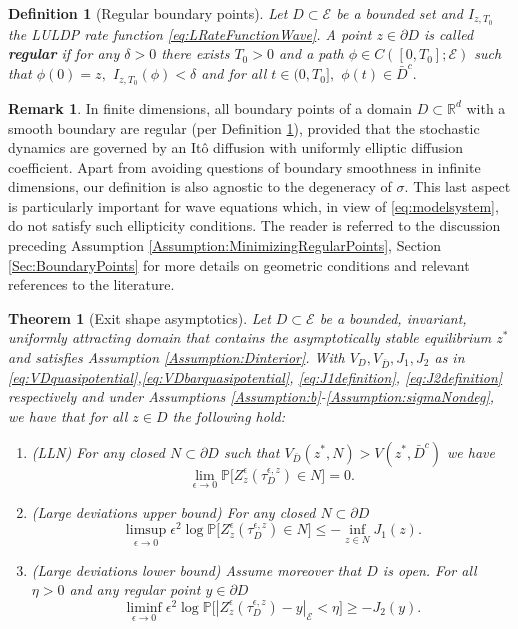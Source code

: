 \documentclass[10pt, reqno]{amsart}
\newcommand{\R}{\mathbb{R}}
\newcommand{\pr}{\mathbb{P}}
\newcommand{\e}{\mathcal{E}}
\newtheorem{thm}{Theorem}
\newtheorem{dfn}{Definition}
\theoremstyle{definition}
\newtheorem{rem}{Remark}
\numberwithin{lem}{section}
\numberwithin{cor}{section}
\numberwithin{prop}{section}
\numberwithin{thm}{section}
\numberwithin{dfn}{section}
\begin{document}
 \begin{dfn}[Regular boundary points]\label{def:regularpoints}
   Let $D\subset\e$ be a bounded set and $I_{z,T_0}$ the LULDP rate function \eqref{eq:LRateFunctionWave}. A point $z\in\partial D$ is called \textbf{regular} if for any $\delta>0$ there exists $T_0>0$ and a path $\phi\in C([0,T_0];\e)$ such that $\phi(0)=z,$ $I_{z,T_0}(\phi)<\delta$
   and for all $t\in(0, T_0],$ $\phi(t)\in\bar{D}^c.$
\end{dfn}


\begin{rem}\label{Rem:RegularPoints} In finite dimensions, all boundary points of a domain $D\subset\R^d$ with a smooth boundary are regular (per Definition \ref{def:regularpoints}), provided that the stochastic dynamics are governed by an It\^o diffusion with uniformly elliptic diffusion coefficient. Apart from avoiding questions of boundary smoothness in infinite dimensions, our definition is also agnostic to the degeneracy of $\sigma.$ This last aspect is particularly important for wave equations which, in view of \eqref{eq:modelsystem}, do not satisfy such ellipticity conditions. The reader is referred to the discussion preceding Assumption \ref{Assumption:MinimizingRegularPoints}, Section \ref{Sec:BoundaryPoints} for more details on geometric conditions and relevant references to the literature. 
\end{rem}

\begin{thm}[Exit shape asymptotics]\label{thm:exitshapeldp} Let $D\subset\e$ be a bounded, invariant, uniformly attracting domain that contains  the asymptotically stable equilibrium $z^*$ and satisfies Assumption \ref{Assumption:Dinterior}. With $V_D, V_{\bar{D}}, J_1, J_2$ as in \eqref{eq:VDquasipotential},\eqref{eq:VDbarquasipotential}, \eqref{eq:J1definition}, \eqref{eq:J2definition} respectively and under Assumptions \ref{Assumption:b}-\ref{Assumption:sigmaNondeg}, we have that for all $z\in D$ the following hold:
\begin{enumerate}
\item (\textnormal{LLN}) For any closed $N\subset\partial D$ such that $V_{\bar{D}}(z^*,N)>V(z^*,  \bar{D}^c)$ we have $$\lim_{\epsilon\to 0}\pr\bigg[  Z^\epsilon_z(\tau_D^{\epsilon, z})\in N\bigg]=0.$$
    \item(\textnormal{Large deviations upper bound}) For any closed  $N\subset \partial D$   \begin{equation}\label{eq:exitshapeLDPub}
    \limsup_{\epsilon\to 0}\epsilon^2\log\pr\bigg[Z^\epsilon_z(\tau^{\epsilon, z}_{D})\in N\bigg]\leq -\inf_{z\in N}J_1(z).    
    \end{equation}
    \item (\textnormal{Large deviations lower bound}) Assume moreover that $D$ is open. For all $\eta>0$ and any regular point $y\in\partial D$
    \begin{equation}\label{eq:exitshapelb}
        \liminf_{\epsilon\to 0}\epsilon^2\log\pr\bigg[ |Z^\epsilon_z(\tau^{\epsilon, z}_{D})-y|_{\e}<\eta \bigg]\geq -J_2(y).
    \end{equation}
    \end{enumerate}   
\end{thm}
\end{document}
